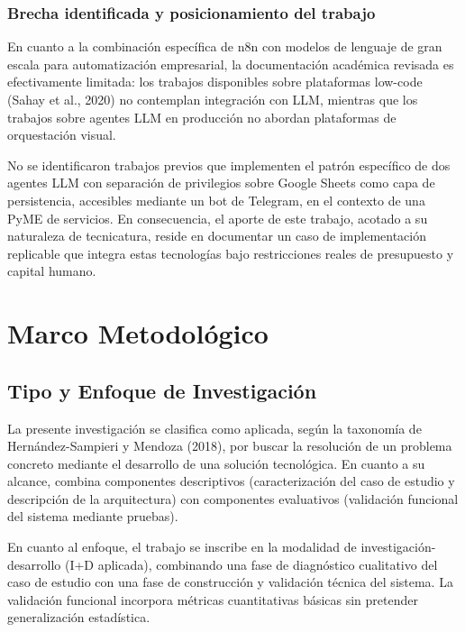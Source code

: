 \documentclass[12pt,a4paper]{report}
\begin{document}
\subsection{Brecha identificada y posicionamiento del trabajo}

En cuanto a la combinación específica de n8n con modelos de lenguaje de gran escala para automatización empresarial, la documentación académica revisada es efectivamente limitada: los trabajos disponibles sobre plataformas low-code (Sahay et al., 2020) no contemplan integración con LLM, mientras que los trabajos sobre agentes LLM en producción no abordan plataformas de orquestación visual.

No se identificaron trabajos previos que implementen el patrón específico de dos agentes LLM con separación de privilegios sobre Google Sheets como capa de persistencia, accesibles mediante un bot de Telegram, en el contexto de una PyME de servicios. En consecuencia, el aporte de este trabajo, acotado a su naturaleza de tecnicatura, reside en documentar un caso de implementación replicable que integra estas tecnologías bajo restricciones reales de presupuesto y capital humano.

\chapter{Marco Metodológico}

\section{Tipo y Enfoque de Investigación}

La presente investigación se clasifica como aplicada, según la taxonomía de Hernández-Sampieri y Mendoza (2018), por buscar la resolución de un problema concreto mediante el desarrollo de una solución tecnológica. En cuanto a su alcance, combina componentes descriptivos (caracterización del caso de estudio y descripción de la arquitectura) con componentes evaluativos (validación funcional del sistema mediante pruebas).

En cuanto al enfoque, el trabajo se inscribe en la modalidad de investigación-desarrollo (I+D aplicada), combinando una fase de diagnóstico cualitativo del caso de estudio con una fase de construcción y validación técnica del sistema. La validación funcional incorpora métricas cuantitativas básicas sin pretender generalización estadística.
\end{document}
